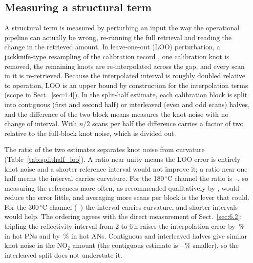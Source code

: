 \subsection{Measuring a structural term}
\label{sec:4.2}

A structural term is measured by perturbing an input the way the operational pipeline can actually be wrong,
re-running the full retrieval and reading the change in the retrieved amount. In leave-one-out (LOO) perturbation,
a jackknife-type resampling of the calibration record \citep{Efron_1979}, one calibration knot is removed, the remaining
knots are re-interpolated across the gap, and every scan in it is re-retrieved. Because the interpolated interval is
roughly doubled relative to operation, LOO is an upper bound by construction for the interpolation terms (scope in
Sect.~\ref{sec:4.4}). In the split-half estimate, each calibration block
is split into contiguous (first and second half) or interleaved (even and odd scans) halves, and the difference of
the two block means measures the knot noise with no change of interval. With $n/2$ scans per half the difference
carries a factor of two relative to the full-block knot noise, which is divided out.

The ratio of the two estimates separates knot noise from curvature (Table~\ref{tab:splithalf_loo}). A ratio near unity
means the LOO error is entirely knot noise and a shorter reference interval would not improve it; a ratio near one
half means the interval carries curvature. For the 180\,$^{\circ}$C channel the ratio is --, so
measuring the references more often, as recommended qualitatively by \citet{Washenfelder_2008}, would reduce the
error little, and averaging more scans per block is the lever that could. For the 300\,$^{\circ}$C channel
(--) the interval carries curvature, and shorter intervals would help. The ordering agrees with the
direct measurement of Sect.~\ref{sec:6.2}: tripling the reflectivity interval from 2 to 6\,h raises the interpolation
error by \,\% in hot PNs and by \,\% in hot ANs. Contiguous and interleaved halves give similar knot noise
in the NO$_2$ amount (the contiguous estimate is --\,\% smaller), so the interleaved split does not
understate it.

